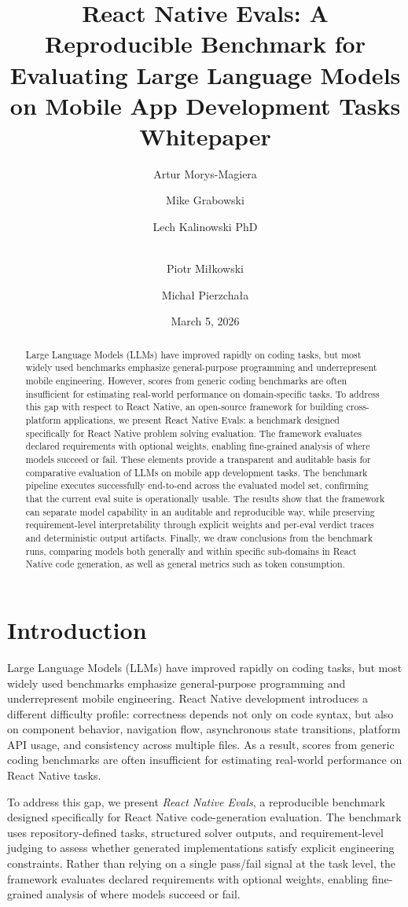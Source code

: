 \documentclass[11pt]{article}
\title{\textbf{React Native Evals: A Reproducible Benchmark for Evaluating Large Language Models on Mobile App Development Tasks}\\ Whitepaper}
\author{Artur Morys-Magiera}
\author{Mike Grabowski}
\author{Lech Kalinowski PhD}
\author{\\Piotr Miłkowski}
\author{Michał Pierzchała}
\affil{Callstack, Poland}
\affil{\{artur.morys-magiera,mike,lech.kalinowski,\\piotr.milkowski,michal.pierzchala\}@callstack.com}
\date{March 5, 2026}
\begin{document}
\maketitle

\begin{abstract}
Large Language Models (LLMs) have improved rapidly on coding tasks, but most widely used benchmarks emphasize general-purpose programming and underrepresent mobile engineering. However, scores from generic coding benchmarks are often insufficient for estimating real-world performance on domain-specific tasks. To address this gap with respect to React Native, an open-source framework for building cross-platform applications, we present React Native Evals: a benchmark designed specifically for React Native problem solving evaluation. The framework evaluates declared requirements with optional weights, enabling fine-grained analysis of where models succeed or fail. These elements provide a transparent and auditable basis for comparative evaluation of LLMs on mobile app development tasks. The benchmark pipeline executes successfully end-to-end across the evaluated model set, confirming that the current eval suite is operationally usable. The results show that the framework can separate model capability in an auditable and reproducible way, while preserving requirement-level interpretability through explicit weights and per-eval verdict traces and deterministic output artifacts. Finally, we draw conclusions from the benchmark runs, comparing models both generally and within specific sub-domains in React Native code generation, as well as general metrics such as token consumption.
\end{abstract}

\section{Introduction}
Large Language Models (LLMs) have improved rapidly on coding tasks, but most widely used benchmarks emphasize general-purpose programming and underrepresent mobile engineering. React Native development introduces a different difficulty profile: correctness depends not only on code syntax, but also on component behavior, navigation flow, asynchronous state transitions, platform API usage, and consistency across multiple files. As a result, scores from generic coding benchmarks are often insufficient for estimating real-world performance on React Native tasks.

To address this gap, we present \textit{React Native Evals}, a reproducible benchmark designed specifically for React Native code-generation evaluation. The benchmark uses repository-defined tasks, structured solver outputs, and requirement-level judging to assess whether generated implementations satisfy explicit engineering constraints. Rather than relying on a single pass/fail signal at the task level, the framework evaluates declared requirements with optional weights, enabling fine-grained analysis of where models succeed or fail.
\end{document}
